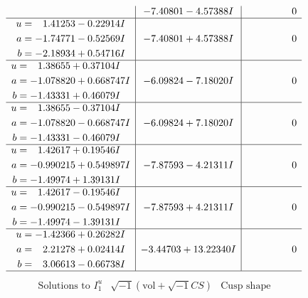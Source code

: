 \documentclass[1p]{elsarticle_modified}
\theoremstyle{definition}
\newcommand{\I}{\sqrt{-1}}
\begin{document}
$$\begin{array}{c|c|c}
 & -7.40801 - 4.57388 I & \phantom{-0.000000 } 0 \\ \hline\begin{aligned}
u &= \phantom{-}1.41253 - 0.22914 I \\
a &= -1.74771 - 0.52569 I \\
b &= -2.18934 + 0.54716 I\end{aligned}
 & -7.40801 + 4.57388 I & \phantom{-0.000000 } 0 \\ \hline\begin{aligned}
u &= \phantom{-}1.38655 + 0.37104 I \\
a &= -1.078820 + 0.668747 I \\
b &= -1.43331 + 0.46079 I\end{aligned}
 & -6.09824 - 7.18020 I & \phantom{-0.000000 } 0 \\ \hline\begin{aligned}
u &= \phantom{-}1.38655 - 0.37104 I \\
a &= -1.078820 - 0.668747 I \\
b &= -1.43331 - 0.46079 I\end{aligned}
 & -6.09824 + 7.18020 I & \phantom{-0.000000 } 0 \\ \hline\begin{aligned}
u &= \phantom{-}1.42617 + 0.19546 I \\
a &= -0.990215 + 0.549897 I \\
b &= -1.49974 + 1.39131 I\end{aligned}
 & -7.87593 - 4.21311 I & \phantom{-0.000000 } 0 \\ \hline\begin{aligned}
u &= \phantom{-}1.42617 - 0.19546 I \\
a &= -0.990215 - 0.549897 I \\
b &= -1.49974 - 1.39131 I\end{aligned}
 & -7.87593 + 4.21311 I & \phantom{-0.000000 } 0 \\ \hline\begin{aligned}
u &= -1.42366 + 0.26282 I \\
a &= \phantom{-}2.21278 + 0.02414 I \\
b &= \phantom{-}3.06613 - 0.66738 I\end{aligned}
 & -3.44703 + 13.22340 I & \phantom{-0.000000 } 0\\
 \hline 
 \end{array}$$\newpage$$\begin{array}{c|c|c}  
\text{Solutions to }I^u_{1}& \I (\text{vol} + \sqrt{-1}CS) & \text{Cusp shape}\\

\end{array}$$
\end{document}
